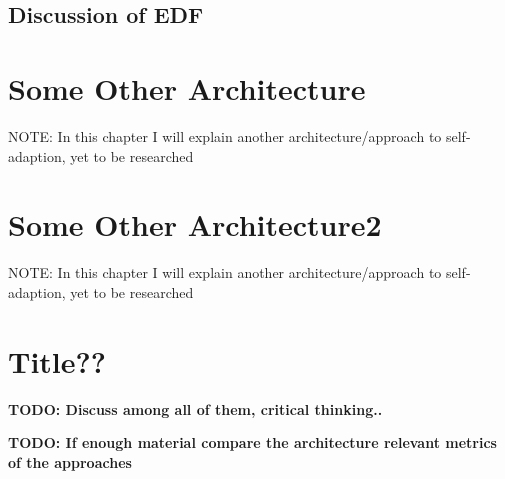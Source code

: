         \subsection{Discussion of EDF}
        \label{sec:discussion-edf}

    \section{Some Other Architecture}
    \label{sec:soa}
    NOTE: In this chapter I will explain another architecture/approach to self-adaption, yet to be researched


    \section{Some Other Architecture2}
    \label{sec:soa2}
    NOTE: In this chapter I will explain another architecture/approach to self-adaption, yet to be researched


    \section{Title??}
    \textbf{TODO: Discuss among all of them, critical thinking..}

    \textbf{TODO: If enough material compare the architecture relevant metrics of the approaches}